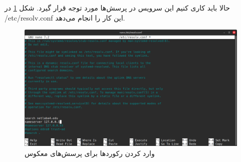 \documentclass[12pt]{article}
\begin{document}
	حالا باید کاری کنیم این سرویس در پرسش‌ها مورد توجه قرار گیرد. شکل \ref{dns:4} در
	 /etc/resolv.conf
	  این کار را انجام می‌دهد.
	\begin{figure}[H]
		\centering
		\includegraphics[width=\textwidth]{resources/6.png}
		\caption{وارد کردن رکورد‌ها برای پرسش‌های معکوس}
		\label{dns:4}
	\end{figure}
	
\end{document}
